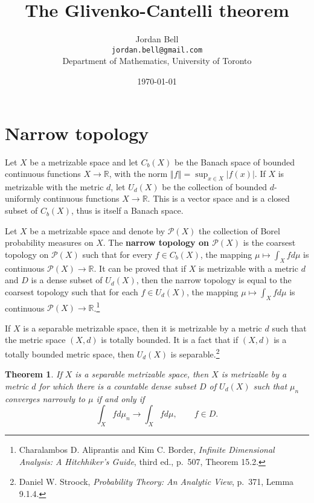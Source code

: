 \documentclass{article}
\newcommand{\norm}[1]{\left\Vert #1 \right\Vert}
\newtheorem{theorem}{Theorem}
\theoremstyle{definition}
\begin{document}
\title{The Glivenko-Cantelli theorem}
\author{Jordan Bell\\ \texttt{jordan.bell@gmail.com}\\Department of Mathematics, University of Toronto}
\date{\today}

\maketitle

\section{Narrow topology}
Let $X$ be a metrizable space and let $C_b(X)$ be the Banach space of bounded continuous functions $X \to \mathbb{R}$, with the norm
$\norm{f} = \sup_{x \in X} |f(x)|$. 
If $X$ is metrizable with the metric $d$, let $U_d(X)$ be the collection of bounded $d$-uniformly continuous functions
$X \to \mathbb{R}$. This is a vector space and is a closed subset of $C_b(X)$, thus is itself a Banach space. 


Let $X$ be a  metrizable space and
denote by $\mathscr{P}(X)$ the collection of Borel probability measures on $X$.
The \textbf{narrow topology on $\mathscr{P}(X)$} is the
coarsest topology on $\mathscr{P}(X)$ such that for every $f \in C_b(X)$,  the mapping
$\mu \mapsto \int_X fd\mu$ is continuous $\mathscr{P}(X) \to \mathbb{R}$.
It can be proved that if $X$ is metrizable with a metric $d$ and $D$ is a dense subset of $U_d(X)$, then
the narrow topology is equal to the coarsest topology such that for each $f \in U_d(X)$, the mapping
$\mu \mapsto \int_X fd\mu$ is continuous $\mathscr{P}(X) \to \mathbb{R}$.\footnote{Charalambos D. 
Aliprantis and Kim C. Border, {\em Infinite Dimensional Analysis: A Hitchhiker's Guide}, third ed., p.~507,
Theorem 15.2.} 

If $X$ is a separable metrizable space, then it is metrizable by a metric $d$ such that the metric space $(X,d)$
is totally bounded. It is a fact that if $(X,d)$ is a totally bounded metric space, then
$U_d(X)$ is separable.\footnote{Daniel W. Stroock, {\em Probability Theory: An Analytic View},
p.~371, Lemma 9.1.4.}

\begin{theorem}
If $X$ is a separable metrizable space, then $X$ is metrizable by a metric $d$ for which there
is a countable dense subset $D$ of $U_d(X)$ such that $\mu_n$ converges narrowly to $\mu$ if and only if
\[
\int_X f d\mu_n \to \int_X f d\mu, \qquad f \in D.
\]
\label{Ud}
\end{theorem}
\end{document}
